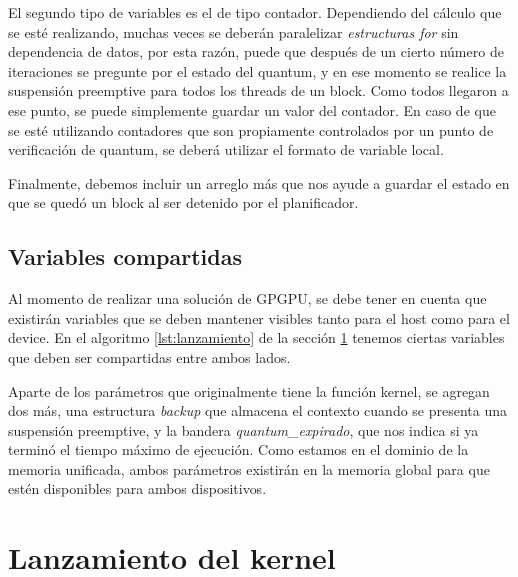 El segundo tipo de variables es el de tipo contador. Dependiendo del cálculo que se esté realizando, muchas veces se deberán paralelizar \textit{estructuras for} sin dependencia de datos, por esta razón, puede que después de un cierto número de iteraciones se pregunte por el estado del quantum, y en ese momento se realice la suspensión preemptive para todos los threads de un block. Como todos llegaron a ese punto, se puede simplemente guardar un valor del contador. En caso de que se esté utilizando contadores que son propiamente controlados por un punto de verificación de quantum, se deberá utilizar el formato de variable local.
\newline

Finalmente, debemos incluir un arreglo más que nos ayude a guardar el estado en que se quedó un block al ser detenido por el planificador.



  \subsection{Variables compartidas}
  
  Al momento de realizar una solución de GPGPU, se debe tener en cuenta que existirán variables que se deben mantener visibles tanto para el host como para el device. En el algoritmo \ref{lst:lanzamiento} de la sección \ref{secc:lanzamientoKernel} tenemos ciertas variables que deben ser compartidas entre ambos lados. 
    \newline
  
  Aparte de los parámetros que originalmente tiene la función kernel, se agregan dos más, una estructura \textit{backup} que almacena el contexto cuando se presenta una suspensión preemptive, y la bandera \textit{quantum\_expirado}, que nos indica si ya terminó el tiempo máximo de ejecución. Como estamos en el dominio de la memoria unificada, ambos parámetros existirán en la memoria global para que estén disponibles para ambos dispositivos.
  
  

\section{Lanzamiento del kernel}\label{secc:lanzamientoKernel}

